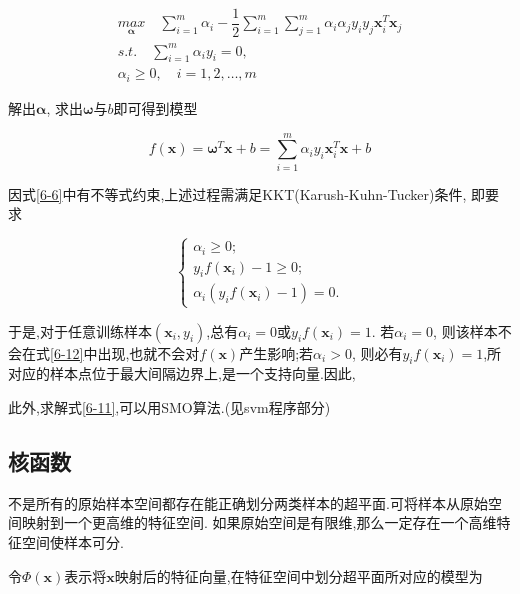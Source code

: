 \documentclass[12pt]{article}
\numberwithin{equation}{section}%
\begin{document}
\begin{equation}
\begin{split} 
{\underset{\boldsymbol{\alpha}}{max}} \quad  \sum_{i=1}^{m}\alpha_{i}-\dfrac{1}{2}\sum_{i=1}^{m}\sum_{j=1}^{m}\alpha_{i}\alpha_{j}y_{i}y_{j}{\boldsymbol{x}}_{i}^{T}{\boldsymbol{x}}_{j}  \\
s.t. \quad \sum_{i=1}^{m}\alpha_{i}y_{i} = 0,  \\
\alpha_{i} \geqslant 0, \quad i=1,2, \ldots, m 
\end{split}
\label{6-11}
\end{equation}

解出$\boldsymbol{\alpha}$, 求出$\boldsymbol{\omega}$与$b$即可得到模型

\begin{equation}
f(\boldsymbol{x})=\boldsymbol{\omega}^{T}\boldsymbol{x}+b=\sum_{i=1}^{m}\alpha_{i}y_{i}{\boldsymbol{x}}_{i}^{T}{\boldsymbol{x}}+b
\label{6-12}
\end{equation}

因式\ref{6-6}中有不等式约束,上述过程需满足KKT(Karush-Kuhn-Tucker)条件, 即要求

\begin{equation}
 \left\{ \begin{array}{ll}
\alpha_{i} \geqslant 0;\\
 y_{i}f(\boldsymbol{x}_{i})-1\geqslant 0; \\
 \alpha_{i}(y_{i}f(\boldsymbol{x}_{i})-1) = 0.
\end{array} \right.
\end{equation}

于是,对于任意训练样本$(\boldsymbol{x}_{i},y_{i})$,总有$\alpha_{i}=0$或$y_{i}f(\boldsymbol{x}_{i}) =1$. 若$\alpha_{i}=0$, 则该样本不会在式\ref{6-12}中出现,也就不会对$f(\boldsymbol{x})$产生影响;若$\alpha_{i} > 0$, 则必有$y_{i}f(\boldsymbol{x}_{i})=1$,所对应的样本点位于最大间隔边界上,是一个支持向量.因此,{\color{red}{训练完成后,大部分的训练样本都不需要保留,最终模型仅与支持向量有关.}}

此外,{\color{blue}求解式\ref{6-11},可以用SMO算法.}(见svm程序部分)

\subsection{核函数}

不是所有的原始样本空间都存在能正确划分两类样本的超平面.可将样本从原始空间映射到一个更高维的特征空间. 如果原始空间是有限维,那么一定存在一个高维特征空间使样本可分.

令$\Phi(\boldsymbol{x})$表示将$\boldsymbol{x}$映射后的特征向量,在特征空间中划分超平面所对应的模型为
\end{document}
